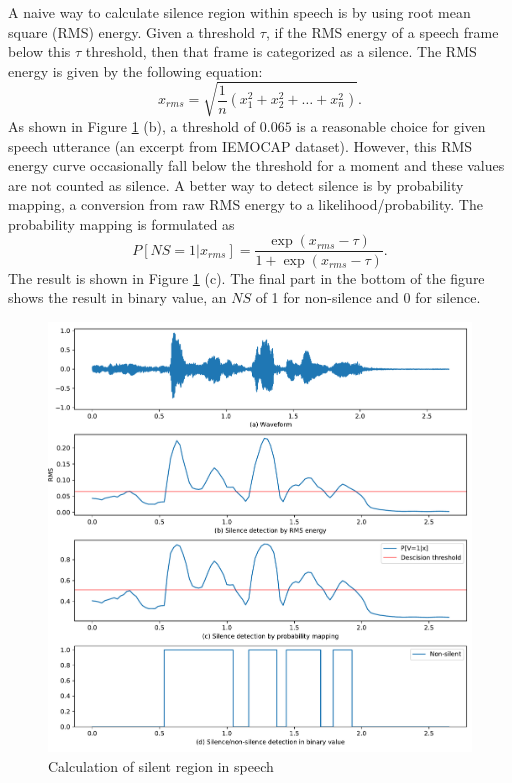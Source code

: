 A naive way to calculate silence region within speech is by using root mean
square (RMS) energy. Given a threshold $\tau$, if the RMS energy of a speech
frame below this $\tau$ threshold, then that frame is categorized as a silence.
The RMS energy is given by the following equation:
\begin{equation}
  x_{rms} = \sqrt{\dfrac{1}{n} (x_1^2 + x_2^2 + \ldots + x_n^2)}.
\end{equation}
As shown in Figure \ref{fig:silence} (b), a threshold of $0.065$ is a
reasonable choice for given speech utterance (an excerpt from IEMOCAP dataset).
However, this RMS energy curve occasionally fall below the threshold for a
moment and these values are not counted as silence. A better way to detect
silence is by probability mapping, a conversion from raw RMS energy to a
likelihood/probability. The probability mapping is formulated as 
\begin{equation}
  P[NS=1 | x_{rms}] = \frac{\exp(x_{rms} - \tau)}{1 + \exp(x_{rms} - \tau)}.
\end{equation}
The result is shown in Figure \ref{fig:silence} (c). The final part in the
bottom of the figure shows the result in binary value, an $NS$ of 1 for
non-silence and 0 for silence.

\begin{figure}
  \centering
  \includegraphics[width=\textwidth]{../fig/silence.pdf}
  \caption{Calculation of silent region in speech}
  \label{fig:silence}
\end{figure}

